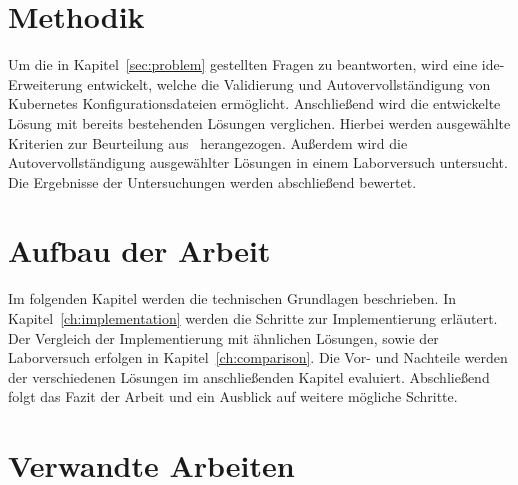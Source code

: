 \section{Methodik}
Um die in Kapitel~\ref{sec:problem} gestellten Fragen zu beantworten, wird eine \acs{ide}-Erweiterung entwickelt, welche die Validierung und Autovervollständigung von
Kubernetes Konfigurationsdateien ermöglicht. Anschließend wird die entwickelte Lösung mit bereits bestehenden Lösungen verglichen.
Hierbei werden ausgewählte Kriterien zur Beurteilung aus~\cite[A Large-Scale Study of Usability Criteria Addressed by Static Analysis Tools]{usability-criteria-static-analysis-tools} herangezogen.
Außerdem wird die Autovervollständigung ausgewählter Lösungen in einem Laborversuch untersucht.
Die Ergebnisse der Untersuchungen werden abschließend bewertet.

\section{Aufbau der Arbeit}
Im folgenden Kapitel werden die technischen Grundlagen beschrieben. In Kapitel~\ref{ch:implementation} werden die Schritte zur Implementierung erläutert.
Der Vergleich der Implementierung mit ähnlichen Lösungen, sowie der Laborversuch erfolgen in Kapitel~\ref{ch:comparison}.
Die Vor- und Nachteile werden der verschiedenen Lösungen im anschließenden Kapitel evaluiert.
Abschließend folgt das Fazit der Arbeit und ein Ausblick auf weitere mögliche Schritte.

\section{Verwandte Arbeiten}